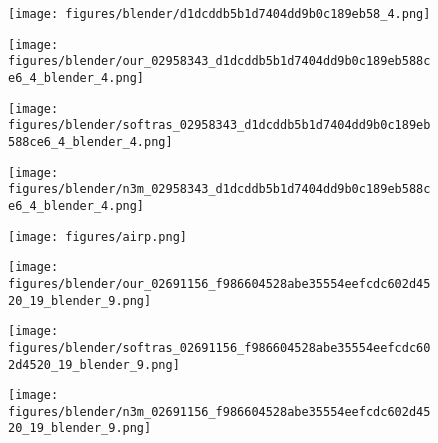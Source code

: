 \documentclass{article}
\begin{document}
\begin{minipage}[t] {0.09\textwidth}
\begin{figure}
    \centering
    \begin{minipage}[t] {0.115\textwidth}
    \centering
    \texttt{[image: figures/blender/d1dcddb5b1d7404dd9b0c189eb58\_4.png]}
    \end{minipage}
    \begin{minipage}[t] {0.115\textwidth}
    \centering
    \texttt{[image: figures/blender/our\_02958343\_d1dcddb5b1d7404dd9b0c189eb588ce6\_4\_blender\_4.png]}
    \end{minipage}
    \begin{minipage}[t] {0.115\textwidth}
    \centering
    \texttt{[image: figures/blender/softras\_02958343\_d1dcddb5b1d7404dd9b0c189eb588ce6\_4\_blender\_4.png]}
    \end{minipage}
    \begin{minipage}[t] {0.115\textwidth}
    \centering
    \texttt{[image: figures/blender/n3m\_02958343\_d1dcddb5b1d7404dd9b0c189eb588ce6\_4\_blender\_4.png]}
    \end{minipage}
    \begin{minipage}[t] {0.115\textwidth}
    \centering
    \texttt{[image: figures/airp.png]}
    \end{minipage}
    \begin{minipage}[t] {0.115\textwidth}
    \centering
    \texttt{[image: figures/blender/our\_02691156\_f986604528abe35554eefcdc602d4520\_19\_blender\_9.png]}
    \end{minipage}
    \begin{minipage}[t] {0.115\textwidth}
    \centering
    \texttt{[image: figures/blender/softras\_02691156\_f986604528abe35554eefcdc602d4520\_19\_blender\_9.png]}
    \end{minipage}
    \begin{minipage}[t] {0.115\textwidth}
    \centering
    \texttt{[image: figures/blender/n3m\_02691156\_f986604528abe35554eefcdc602d4520\_19\_blender\_9.png]}
    \end{minipage}
    \begin{minipage}[t] {0.115\textwidth}

\end{minipage}
\end{figure}
\end{minipage}
\end{document}
